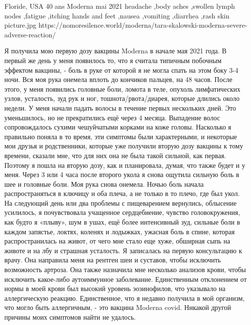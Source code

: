           {Floride, USA}
          {40 ans}
          {Moderna}
          {mai 2021}
          {headache
            ,body aches
            ,swollen lymph nodes
            ,fatigue
            ,itching hands and feet
            ,nausea
            ,vomiting
            ,diarrhea
            ,rash skin
          }
          {picture.jpg}
          {https://nomoresilence.world/moderna/tara-skalowski-moderna-severe-adverse-reaction/}
          {

\normalsize

Я получила мою первую дозу вакцины Moderna в начале мая 2021 года. В первый же
день у меня появилось то, что я считала типичным побочным эффектом вакцины, -
боль в руке от которой я не могла спать на этом боку 3-4 ночи. Вся моя рука
онемела вплоть до кончиков пальцев, на 48 часов. После этого, у меня появились
головные боли, ломота в теле, опухоль лимфатических узлов, усталость, зуд рук и
ног, тошнота/рвота/диарея, которые длились около недели. У меня начали падать
волосы в течение первых нескольких дней. Это уменьшилось, но не прекратились ещё
через 4 месяца. Выпадение волос сопровождалось сухими чешуйчатыми корками на
коже головы. Насколько я правильно поняла в то время, эти симптомы были
характерными, и некоторые мои друзья и родственники, которые уже получили вторую
дозу вакцины к тому времени, сказали мне, что для них она не была такой сильной,
как первая. Поэтому я пошла на вторую дозу, как и планировала, думая, что также
будет и у меня. Через 3 или 4 часа после второго укола я снова ощутила сильную
боль в шее и головные боли. Моя рука снова онемела. Ночью боль начала
распространяться в ключицу и оба плеча, а не только в то плечо, где был укол. На
следующий день или два проблемы с пищеварением вернулись, облысение усилилось, я
почувствовала учащенное сердцебиение, чувство головокружения, как будто я
«плыву», шум в ушах, ещё более интенсивный зуд, сильные боли в каждом запястье,
локтях, коленях и лодыжках, ужасная боль в спине, которая распространилась на
живот, от чего мне стало еще хуже, обширная сыпь на животе и на лбу и страшная
усталость. Я записалась на первую консультацию к врачу. Она направила меня на
рентген шеи и суставов, чтобы исключить возможность артроза. Она также назначила
мне несколько анализов крови, чтобы исключить какое-либо аутоиммунное
заболевание. Единственным отклонением от нормы в моей крови был высокий уровень
эозинофилов, что указывало на аллергическую реакцию. Единственное, что я недавно
получила в мой организм, что могло быть аллергичным, - это вакцина Moderna
covid. Никакой другой причины моих симптомов найти не удалось.

}
